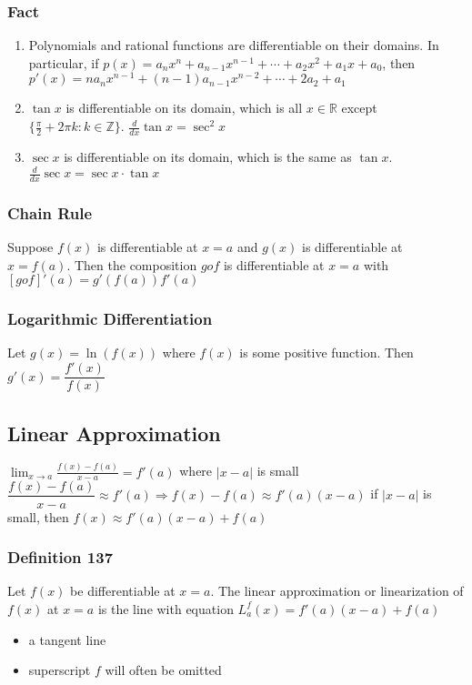 \documentclass[12pt, letterpaper]{article}
\begin{document}
\subsubsection*{Fact}
\begin{enumerate}
    \item Polynomials and rational functions are differentiable on their domains. In particular, if $p(x) = a_nx^n + a_{n-1}x^{n-1} + \cdots + a_2x^2 + a_1x + a_0$, then $p'(x) = na_nx^{n-1} + (n-1)a_{n-1}x^{n-2} + \cdots + 2a_2 + a_1$
    \item $\tan x$ is differentiable on its domain, which is all $x\in\mathbb{R}$ except $\{\frac{\pi}{2}+2\pi k : k\in\mathbb{Z}\}$. $\frac{d}{dx}\tan x = \sec^2 x$
    \item $\sec x$ is differentiable on its domain, which is the same as $\tan x$. $\frac{d}{dx} \sec x = \sec x \cdot \tan x$
\end{enumerate}
\subsubsection*{Chain Rule}
Suppose $f(x)$ is differentiable at $x=a$ and $g(x)$ is differentiable at $x=f(a)$. Then the composition $gof$ is differentiable at $x=a$ with $[gof]'(a) = g'(f(a))f'(a)$
\subsubsection*{Logarithmic Differentiation}
Let $g(x) = \ln(f(x))$ where $f(x)$ is some positive function. Then $g'(x) = \dfrac{f'(x)}{f(x)}$
\subsection{Linear Approximation}
$\displaystyle\lim_{x\to a} \frac{f(x) - f(a)}{x-a} = f'(a)$ where $|x-a|$ is small $\dfrac{f(x) - f(a)}{x-a} \approx f'(a) \Rightarrow f(x)-f(a)\approx f'(a)(x-a)$
if $|x-a|$ is small, then $f(x)\approx f'(a)(x-a) + f(a)$
\subsubsection*{Definition 137}
Let $f(x)$ be differentiable at $x=a$. The linear approximation or linearization of $f(x)$ at $x=a$ is the line with equation 
$L^f_a(x) = f'(a)(x-a) + f(a)$
\begin{itemize}
    \item a tangent line
    \item superscript $f$ will often be omitted
\end{itemize}
\end{document}
